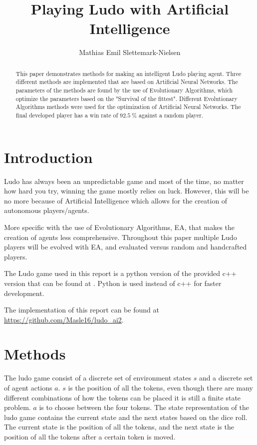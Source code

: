 \documentclass{llncs}
\begin{document}
\newpage

\title{Playing Ludo with Artificial Intelligence}
\author{Mathias Emil Slettemark-Nielsen}
\maketitle

\begin{abstract}
This paper demonstrates methods for making an intelligent Ludo playing agent. Three different methods are implemented that are based on Artificial Neural Networks. The parameters of the methods are found by the use of Evolutionary Algorithms, which optimize the parameters based on the "Survival of the fittest". Different Evolutionary Algorithms methods were used for the optimization of Artificial Neural Networks. The final developed player has a win rate of $92.5\ \%$ against a random player.
\end{abstract}

\section{Introduction} \label{sec:intro}
Ludo has always been an unpredictable game and most of the time, no matter how hard you try, winning the game mostly relies on luck. However, this will be no more because of Artificial Intelligence which allows for the creation of autonomous players/agents.

More specific with the use of Evolutionary Algorithms, EA, that makes the creation of agents less comprehensive. Throughout this paper multiple Ludo players will be evolved with EA, and evaluated versus random and handcrafted players.

The Ludo game used in this report is a python version of the provided c++ version that can be found at \cite{ludo_game}. Python is used instead of c++ for faster development.

The implementation of this report can be found at \url{https://github.com/Masle16/ludo_ai2}.

\section{Methods} \label{sec:methods}
The ludo game consist of a discrete set of environment states $s$ and a discrete set of agent actions $a$. $s$ is the position of all the tokens, even though there are many different combinations of how the tokens can be placed it is still a finite state problem. $a$ is to choose between the four tokens. The state representation of the ludo game contains the current state and the next states based on the dice roll. The current state is the position of all the tokens, and the next state is the position of all the tokens after a certain token is moved.
\end{document}
